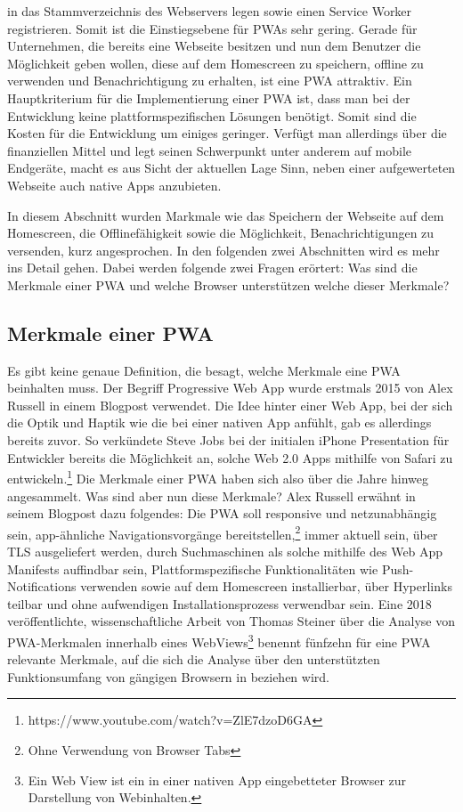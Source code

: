 in das Stammverzeichnis des Webservers legen sowie einen Service Worker registrieren.
Somit ist die Einstiegsebene für PWAs sehr gering. Gerade für Unternehmen,
die bereits eine Webseite besitzen und nun dem Benutzer die Möglichkeit geben wollen,
diese auf dem Homescreen zu speichern, offline zu verwenden und Benachrichtigung zu erhalten,
ist eine PWA attraktiv. Ein Hauptkriterium für die Implementierung einer PWA ist, dass man bei der Entwicklung
keine plattformspezifischen Lösungen benötigt. Somit sind die Kosten für die Entwicklung um einiges
geringer. Verfügt man allerdings über die finanziellen Mittel und legt seinen Schwerpunkt unter anderem
auf mobile Endgeräte, macht es aus Sicht der aktuellen Lage Sinn, neben einer aufgewerteten Webseite
auch native Apps anzubieten.

In diesem Abschnitt wurden Markmale wie das Speichern der Webseite auf dem Homescreen,
die Offlinefähigkeit sowie die Möglichkeit, Benachrichtigungen zu versenden, kurz angesprochen.
In den folgenden zwei Abschnitten wird es mehr ins Detail gehen. Dabei werden folgende
zwei Fragen erörtert: Was sind die Merkmale einer PWA und welche Browser unterstützen
welche dieser Merkmale?

\subsection{Merkmale einer PWA}
\label{subsec:markmaleeinerpwa}
Es gibt keine genaue Definition, die besagt, welche Merkmale eine PWA beinhalten muss.
Der Begriff Progressive Web App wurde erstmals 2015 von Alex Russell in einem Blogpost
verwendet.\cite{PWA2015} Die Idee hinter einer Web App, bei der sich die Optik und Haptik
wie die bei einer nativen App anfühlt, gab es allerdings bereits zuvor. So verkündete
Steve Jobs bei der initialen iPhone Presentation für Entwickler bereits die Möglichkeit
an, solche Web 2.0 Apps mithilfe von Safari zu entwickeln.\footnote{https://www.youtube.com/watch?v=ZlE7dzoD6GA}
Die Merkmale einer PWA haben sich also über die Jahre hinweg angesammelt. Was sind aber
nun diese Merkmale? Alex Russell erwähnt in seinem Blogpost dazu folgendes:
Die PWA soll responsive und netzunabhängig sein, app-ähnliche Navigationsvorgänge bereitstellen,\footnote{Ohne Verwendung von Browser Tabs} 
immer aktuell sein, über TLS ausgeliefert werden, durch Suchmaschinen als solche mithilfe
des Web App Manifests auffindbar sein, Plattformspezifische Funktionalitäten wie Push-Notifications
verwenden sowie auf dem Homescreen installierbar, über Hyperlinks teilbar und ohne aufwendigen
Installationsprozess verwendbar sein.\cite{PWA2015} Eine 2018 veröffentlichte, wissenschaftliche
Arbeit von Thomas Steiner über die Analyse von PWA-Merkmalen innerhalb eines WebViews\footnote{Ein Web View ist ein in einer nativen App eingebetteter Browser zur Darstellung von Webinhalten.}
benennt fünfzehn für eine PWA relevante Merkmale, auf die sich die Analyse über den
unterstützten Funktionsumfang von gängigen Browsern in 
beziehen wird.\cite{WhatIsInAWebView}

